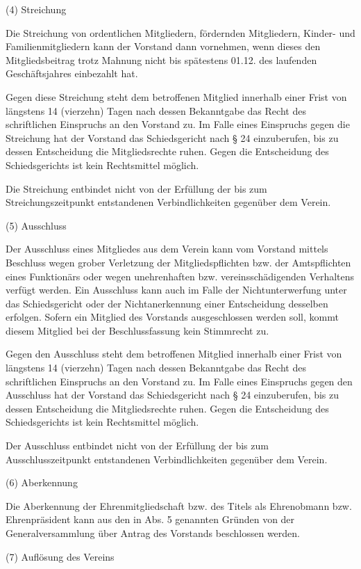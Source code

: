 \documentclass[11pt,a4paper]{article}
\begin{document}
(4)
Streichung

Die Streichung von ordentlichen Mitgliedern, fördernden Mitgliedern, Kinder- und Familienmitgliedern kann der Vorstand dann vornehmen, wenn dieses den Mitgliedsbeitrag trotz Mahnung nicht bis spätestens 01.12. des laufenden Geschäftsjahres einbezahlt hat.

Gegen diese Streichung steht dem betroffenen Mitglied innerhalb einer Frist von längstens 14 (vierzehn) Tagen nach dessen Bekanntgabe das Recht des schriftlichen Einspruchs an den Vorstand zu.
Im Falle eines Einspruchs gegen die Streichung hat der Vorstand das Schiedsgericht nach § 24 einzuberufen, bis zu dessen Entscheidung die Mitgliedsrechte ruhen.
Gegen die Entscheidung des Schiedsgerichts ist kein Rechtsmittel möglich.

Die Streichung entbindet nicht von der Erfüllung der bis zum Streichungszeitpunkt entstandenen Verbindlichkeiten gegenüber dem Verein.

(5)
Ausschluss

Der Ausschluss eines Mitgliedes aus dem Verein kann vom Vorstand mittels Beschluss wegen grober Verletzung der Mitgliedspflichten bzw. der Amtspflichten eines Funktionärs oder wegen unehrenhaften bzw. vereinsschädigenden Verhaltens verfügt werden.
Ein Ausschluss kann auch im Falle der Nichtunterwerfung unter das Schiedsgericht oder der Nichtanerkennung einer Entscheidung desselben erfolgen.
Sofern ein Mitglied des Vorstands ausgeschlossen werden soll, kommt diesem Mitglied bei der Beschlussfassung kein Stimmrecht zu.

Gegen den Ausschluss steht dem betroffenen Mitglied innerhalb einer Frist von längstens 14 (vierzehn) Tagen nach dessen Bekanntgabe das Recht des schriftlichen Einspruchs an den Vorstand zu.
Im Falle eines Einspruchs gegen den Ausschluss hat der Vorstand das Schiedsgericht nach § 24 einzuberufen, bis zu dessen Entscheidung die Mitgliedsrechte ruhen.
Gegen die Entscheidung des Schiedsgerichts ist kein Rechtsmittel möglich.

Der Ausschluss entbindet nicht von der Erfüllung der bis zum Ausschlusszeitpunkt entstandenen Verbindlichkeiten gegenüber dem Verein.

(6)
Aberkennung

Die Aberkennung der Ehrenmitgliedschaft bzw. des Titels als Ehrenobmann bzw. Ehrenpräsident kann aus den in Abs. 5 genannten Gründen von der Generalversammlung über Antrag des Vorstands beschlossen werden.

(7)
Auflösung des Vereins
\end{document}
